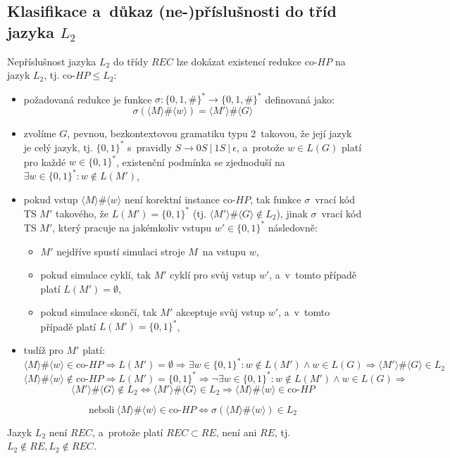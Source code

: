 \documentclass[a4paper, 11pt]{article}
\begin{document}
\subsection*{Klasifikace a~důkaz (ne-)příslušnosti do tříd jazyka $L_2$}

Nepříslušnost jazyka $L_2$ do třídy $REC$ lze dokázat existencí redukce co-$HP$ na jazyk $L_2$, tj. co-$HP \leq L_2$:

\begin{itemize}
    \item požadovaná redukce je funkce $\sigma : \{ 0, 1, \# \}^* \rightarrow \{ 0, 1, \# \}^*$ definovaná jako:
    $$\sigma ( \langle M \rangle \# \langle w \rangle ) = \langle M' \rangle \# \langle G \rangle$$
    \item zvolíme $G$, pevnou, bezkontextovou gramatiku typu 2~takovou, že její jazyk je celý jazyk, tj. $\{ 0, 1 \}^*$ s~pravidly $S \rightarrow 0S\ |\ 1S\ |\ \epsilon$, a~protože $w \in L(G)$ platí pro každé $w \in \{ 0, 1 \}^*$, existenční podmínka se zjednoduší na $\exists w \in \{ 0, 1 \}^* : w \notin L(M')$,
    \item pokud vstup $\langle M \rangle \# \langle w \rangle$ není korektní instance co-$HP$, tak funkce $\sigma$~vrací kód TS $M'$ takového, že $L(M') = \{ 0, 1 \}^*$ (tj. $\langle M' \rangle \# \langle G \rangle \notin L_2$), jinak $\sigma$~vrací kód TS $M'$, který pracuje na jakémkoliv vstupu $w' \in \{ 0, 1 \}^*$ následovně:
    \begin{itemize}
        \item $M'$ nejdříve spustí simulaci stroje $M$~na vstupu $w$,
        \item pokud simulace cyklí, tak $M'$ cyklí pro svůj vstup $w'$, a~v~tomto případě platí $L(M') = \emptyset$,
        \item pokud simulace skončí, tak $M'$ akceptuje svůj vstup $w'$, a~v~tomto případě platí $L(M') = \{ 0, 1 \}^*$,
    \end{itemize}
    \item tudíž pro $M'$ platí:
    $$\langle M \rangle \# \langle w \rangle \in \textrm{co-}HP \Rightarrow L(M') = \emptyset \Rightarrow \exists w \in \{ 0, 1 \}^* : w \notin L(M') \wedge w \in L(G) \Rightarrow \langle M' \rangle \# \langle G \rangle \in L_2$$
    $$\langle M \rangle \# \langle w \rangle \notin \textrm{co-}HP \Rightarrow L(M') = \{ 0, 1 \}^* \Rightarrow \neg \exists w \in \{ 0, 1 \}^* : w \notin L(M') \wedge w \in L(G) \Rightarrow$$
    $$\langle M' \rangle \# \langle G \rangle \notin L_2 \Longleftrightarrow \langle M' \rangle \# \langle G \rangle \in L_2 \Rightarrow \langle M \rangle \# \langle w \rangle \in \textrm{co-}HP$$

    $$\textrm{neboli}\ \langle M \rangle \# \langle w \rangle \in \textrm{co-}HP \Longleftrightarrow \sigma ( \langle M \rangle \# \langle w \rangle ) \in L_2$$
\end{itemize}
Jazyk $L_2$ není $REC$, a~protože platí $REC \subset RE$, není ani $RE$, tj. $L_2 \notin RE, L_2 \notin REC$.
\end{document}
